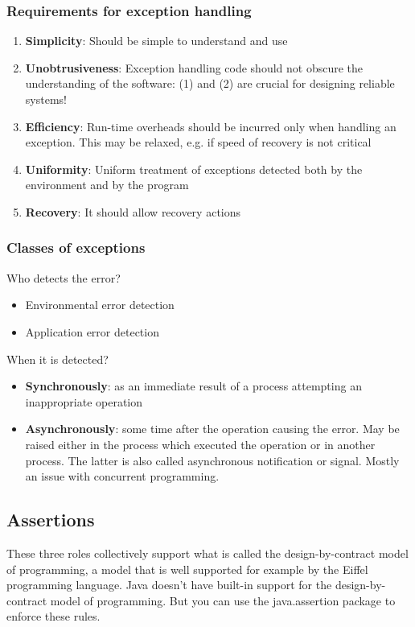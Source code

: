\documentclass[10pt]{article}
\begin{document}
\subsubsection{Requirements for exception handling}
\begin{enumerate}
	\item \textbf{Simplicity}: Should be simple to understand and use
	\item \textbf{Unobtrusiveness}: Exception handling code should not obscure the understanding of the software: (1) and (2) are crucial for designing reliable systems!
	\item \textbf{Efficiency}: Run-time overheads should be incurred only when handling an exception. This may be relaxed, e.g. if speed of recovery is not critical
	\item \textbf{Uniformity}: Uniform treatment of exceptions detected both by the environment and by the program
	\item \textbf{Recovery}: It should allow recovery actions
\end{enumerate}
\subsubsection{Classes of exceptions}
Who detects the error?
\begin{itemize}
	\item Environmental error detection
	\item Application error detection
\end{itemize}
When it is detected?
\begin{itemize}
	\item \textbf{Synchronously}: as an immediate result of a process attempting an inappropriate operation
	\item \textbf{Asynchronously}: some time after the operation causing the error. May be raised either in the process which executed the operation or in another process. The latter is also called asynchronous notification or signal. Mostly an issue with concurrent programming.
\end{itemize}
\subsection{Assertions}
These three roles collectively support what is called the design-by-contract model of programming, a model that is well supported for example by the Eiffel programming language. Java doesn't have built-in support for the design-by-contract model of programming. But you can use the java.assertion package to enforce these rules.
\end{document}
